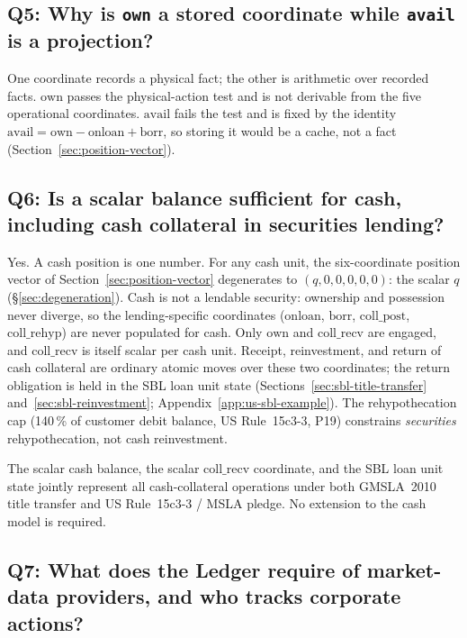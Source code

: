 \subsection*{Q5: Why is \texttt{own} a stored coordinate while \texttt{avail} is a projection?}

One coordinate records a physical fact; the other is arithmetic over recorded facts. $\mathrm{own}$ passes the physical-action test and is not derivable from the five operational coordinates. $\mathrm{avail}$ fails the test and is fixed by the identity $\mathrm{avail} = \mathrm{own} - \mathrm{onloan} + \mathrm{borr}$, so storing it would be a cache, not a fact (Section~\ref{sec:position-vector}).

\subsection*{Q6: Is a scalar balance sufficient for cash, including cash collateral in securities lending?}

Yes. A cash position is one number. For any cash unit, the six-coordinate position vector of Section~\ref{sec:position-vector} degenerates to $(q,0,0,0,0,0)$: the scalar $q$ (\S\ref{sec:degeneration}). Cash is not a lendable security: ownership and possession never diverge, so the lending-specific coordinates ($\mathrm{onloan}$, $\mathrm{borr}$, $\mathrm{coll\_post}$, $\mathrm{coll\_rehyp}$) are never populated for cash. Only $\mathrm{own}$ and $\mathrm{coll\_recv}$ are engaged, and $\mathrm{coll\_recv}$ is itself scalar per cash unit. Receipt, reinvestment, and return of cash collateral are ordinary atomic moves over these two coordinates; the return obligation is held in the SBL loan unit state (Sections~\ref{sec:sbl-title-transfer} and~\ref{sec:sbl-reinvestment}; Appendix~\ref{app:us-sbl-example}). The rehypothecation cap (140\,\% of customer debit balance, US Rule~15c3-3, P19) constrains \emph{securities} rehypothecation, not cash reinvestment.

The scalar cash balance, the scalar $\mathrm{coll\_recv}$ coordinate, and the SBL loan unit state jointly represent all cash-collateral operations under both GMSLA~2010 title transfer and US Rule~15c3-3 / MSLA pledge. No extension to the cash model is required.

\subsection*{Q7: What does the Ledger require of market-data providers, and who tracks corporate actions?}

